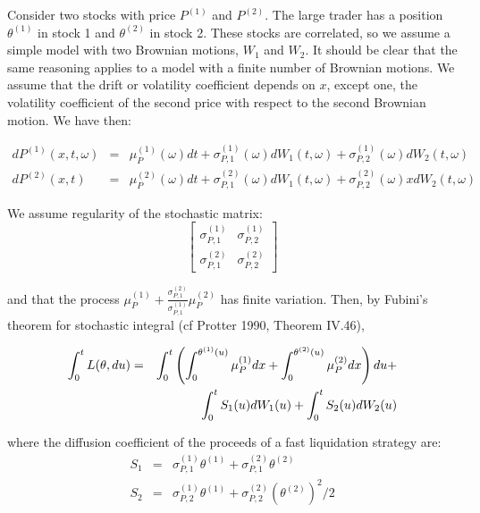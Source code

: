 \documentclass{article}
\begin{document}
Consider two stocks with price $P^{(1)}$ and $P^{(2)}$. The large trader has
a position $\theta ^{(1)}$ in stock 1 and $\theta ^{(2)}$ in stock 2. These
stocks are correlated, so we assume a simple model with two Brownian
motions, $W_{1}$ and $W_{2}$. It should be clear that the same reasoning
applies to a model with a finite number of Brownian motions. We assume that
the drift or volatility coefficient depends on $x$, except one, the
volatility coefficient of the second price with respect to the second
Brownian motion. We have then:

\begin{eqnarray*}
dP^{(1)}(x,t,\omega ) &=&\mu _{P}^{(1)}(\omega )dt+\sigma
_{P,1}^{(1)}(\omega )dW_{1}(t,\omega )+\sigma _{P,2}^{(1)}(\omega
)dW_{2}(t,\omega ) \\
dP^{(2)}(x,t) &=&\mu _{P}^{(2)}(\omega )dt+\sigma _{P,1}^{(2)}(\omega
)dW_{1}(t,\omega )+\sigma _{P,2}^{(2)}(\omega )xdW_{2}(t,\omega )
\end{eqnarray*}

We assume regularity of the stochastic matrix:
\begin{equation*}
\left[
\begin{array}{cc}
\sigma _{P,1}^{(1)} & \sigma _{P,2}^{(1)} \\
\sigma _{P,1}^{(2)} & \sigma _{P,2}^{(2)}%
\end{array}%
\right]
\end{equation*}

and that the process $\mu _{P}^{(1)}+\frac{\sigma _{P,1}^{(2)}}{\sigma
_{P,1}^{(1)}}\mu _{P}^{(2)}$ has finite variation. Then, by Fubini's theorem
for stochastic integral (cf Protter 1990, Theorem IV.46),

\begin{eqnarray}
\int_{0}^{t}L(\theta ,du) &=&\int_{0}^{t}\left( \int_{0}^{\theta
^{(1)}(u)}\mu _{P}^{(1)}dx+\int_{0}^{\theta ^{(2)}(u)}\mu
_{P}^{(2)}dx\right) du+  \label{Lds} \\
&&\int_{0}^{t}S_{1}(u)dW_{1}(u)+\int_{0}^{t}S_{2}(u)dW_{2}(u)  \notag
\end{eqnarray}

where the diffusion coefficient of the proceeds of a fast liquidation
strategy are:%
\begin{eqnarray}
S_{1} &=&\sigma _{P,1}^{(1)}\theta ^{(1)}+\sigma _{P,1}^{(2)}\theta ^{(2)} \\
S_{2} &=&\sigma _{P,2}^{(1)}\theta ^{(1)}+\sigma _{P,2}^{(2)}(\theta
^{(2)})^{2}/2
\end{eqnarray}
\end{document}
